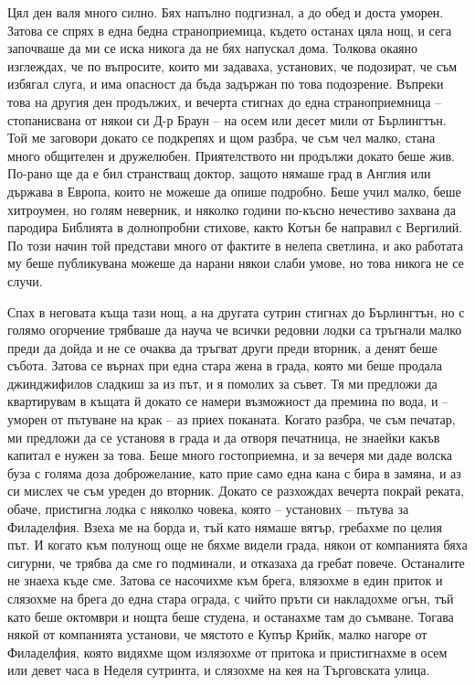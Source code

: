 \documentclass[12pt]{book}
\begin{document}
Цял ден валя много силно. Бях напълно подгизнал, а до обед и доста уморен. Затова се спрях в една бедна страноприемица, където останах цяла нощ, и сега започваше да ми се иска никога да не бях напускал дома. Толкова окаяно изглеждах, че по въпросите, които ми задаваха, установих, че подозират, че съм избягал слуга, и има опасност да бъда задържан по това подозрение. Въпреки това на другия ден продължих, и вечерта стигнах до една страноприемница – стопанисвана от някои си Д-р Браун – на  осем или десет мили от Бърлингтън. Той ме заговори докато се подкрепях и щом разбра, че съм чел малко, стана много общителен и дружелюбен. Приятелството ни продължи докато беше жив. По-рано ще да е бил странстващ доктор, защото нямаше град в Англия или държава в Европа, които не можеше да опише подробно. Беше учил малко, беше хитроумен, но голям неверник, и няколко години по-късно нечестиво захвана да пародира Библията в долнопробни стихове, както Котън бе направил с Вергилий. По този начин той представи много от фактите в нелепа светлина, и ако работата му беше публикувана можеше да нарани някои слаби умове, но това никога не се случи. 

Спах в неговата къща тази нощ, а на другата сутрин стигнах до Бърлингтън, но с голямо огорчение трябваше да науча че всички редовни лодки са тръгнали малко преди да дойда и не се очаква да тръгват други преди вторник, а денят беше събота. Затова се върнах при една стара жена в града, която ми беше продала джинджифилов сладкиш за из път, и я помолих за съвет. Тя ми предложи да квартирувам в къщата й докато се намери възможност да премина по вода, и – уморен от пътуване на крак – аз приех поканата. Когато разбра, че съм печатар, ми предложи да се установя в града и да отворя печатница, не знаейки какъв капитал е нужен за това. Беше много гостоприемна, и за вечеря ми даде волска буза с голяма доза доброжелание, като прие само една кана с бира в замяна, и аз си мислех че съм уреден до вторник. Докато се разхождах вечерта покрай реката, обаче, пристигна лодка с няколко човека, която – установих – пътува за Филаделфия. Взеха ме на борда и, тъй като нямаше вятър, гребахме по целия път. И когато към полунощ още не бяхме видели града, някои от компанията бяха сигурни, че трябва да сме го подминали, и отказаха да гребат повече. Останалите не знаеха къде сме. Затова се насочихме към брега, влязохме в един приток и слязохме на брега до една стара ограда, с чийто пръти си накладохме огън, тъй като беше октомври и нощта беше студена, и останахме там до съмване. Тогава някой от компанията установи, че мястото е Купър Крийк, малко нагоре от Филаделфия, която видяхме щом излязохме от притока и пристигнахме в осем или девет часа в Неделя сутринта, и слязохме на кея на Търговската улица.
\end{document}
